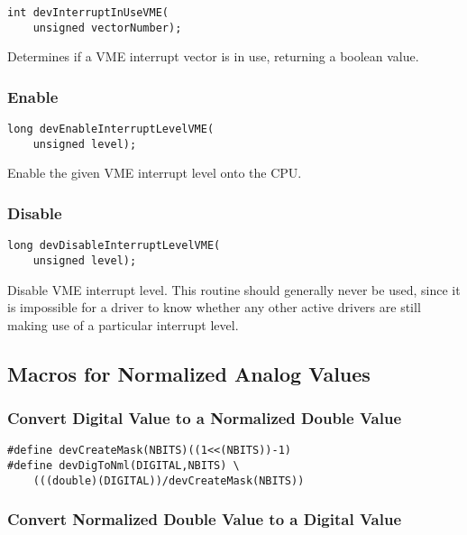 \begin{verbatim}
int devInterruptInUseVME(
    unsigned vectorNumber);
\end{verbatim}

Determines if a VME interrupt vector is in use, returning a boolean value.

\subsubsection{Enable}

\begin{verbatim}
long devEnableInterruptLevelVME(
    unsigned level);
\end{verbatim}

Enable the given VME interrupt level onto the CPU.

\subsubsection{Disable}

\begin{verbatim}
long devDisableInterruptLevelVME(
    unsigned level);
\end{verbatim}

Disable VME interrupt level. This routine should generally never be used, since it is impossible for a driver to know 
whether any other active drivers are still making use of a particular interrupt level.

\subsection{Macros for Normalized Analog Values}

\subsubsection{Convert Digital Value to a Normalized Double Value}

\begin{verbatim}
#define devCreateMask(NBITS)((1<<(NBITS))-1)
#define devDigToNml(DIGITAL,NBITS) \
    (((double)(DIGITAL))/devCreateMask(NBITS))
\end{verbatim}

\subsubsection{Convert Normalized Double Value to a Digital Value}

